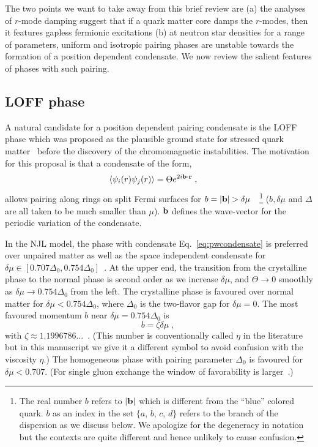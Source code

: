 \documentclass[10pt, aps, prd, superscriptaddress, nofootinbib, 
               amsmath, amssymb, twocolumn,
               preprintnumbers, showpacs,
               raggedbottom,
               floatfix]{revtex4-1}
\newcommand{\bfr}{{\bf{r}}}
\newcommand{\bfb}{{\bf{b}}}
\begin{document}
The two points we want to take away from this brief review are (a) the
analyses of $r$-mode damping suggest that if a quark matter core damps the
$r$-modes,  then it features gapless fermionic excitations (b) at neutron
star densities for a range of parameters, uniform and isotropic pairing phases are
unstable towards the formation of a position dependent condensate. We now 
review the salient features of phases with such pairing.

\subsection{LOFF phase}
\label{loff}
A natural candidate for a position dependent pairing condensate is the LOFF
phase which was proposed as the plausible ground state for stressed quark
matter~\cite{Alford:2000ze,Kundu:2001tt} before the discovery of the
chromomagnetic instabilities. The motivation for this proposal is that a
condensate of the form,
\begin{equation}
\begin{split}
\langle\psi_{i}(r)\psi_{j}(r)\rangle &=  \Theta
e^{2i\bfb\cdot\bfr}\;,~\label{eq:pwcondensate}
\end{split}
\end{equation}
allows pairing along rings on split Fermi surfaces for
$b=|\bfb|>\delta\mu$~\cite{Alford:2000ze}~\footnote{The real number $b$ refers
to $|\bfb|$ which is different from the ``blue'' colored quark. $b$ as an index
in the set $\{a$, $b$, $c$, $d\}$ refers to the branch of the dispersion as we
discuss below. We apologize for the degeneracy in notation but the contexts
are quite different and hence unlikely to cause confusion.} ($b,
\delta\mu$ and $\Delta$ are all taken
to be much smaller than $\mu$). $\bfb$ defines the wave-vector for the periodic
variation of the condensate.

In the NJL model, the phase with condensate Eq.~\ref{eq:pwcondensate} is preferred over
unpaired matter as well as the space independent condensate for
$\delta\mu\in[0.707\Delta_0,0.754\Delta_0]$~\cite{Alford:2000ze}. At the
upper end, the  transition from the crystalline phase to the normal phase is
second order as we increase $\delta\mu$, and $\Theta\rightarrow 0$ smoothly as
$\delta\mu\rightarrow0.754\Delta_0$ from the left. The
crystalline phase is favoured over normal matter for $\delta\mu<0.754\Delta_0$,
where $\Delta_0$ is the two-flavor gap for $\delta\mu=0$. The most favoured
momentum $b$ near $\delta\mu=0.754\Delta_0$ is
\begin{equation}
b=\zeta\delta\mu\;,~\label{eq:eta}
\end{equation}
with $\zeta\approx1.1996786...$~\cite{larkin1964nonuniform,fulde1964superconductivity,
Bowers:2002xr,Bowers:2003ye,Mannarelli:2006}.  (This number is
conventionally called $\eta$ in the literature but in this manuscript we give
it a different symbol to avoid confusion with the viscosity $\eta$.) The
homogeneous phase with pairing parameter $\Delta_0$ is favoured for
$\delta\mu<0.707$. (For single gluon exchange the window of favorability is
larger~\cite{Leibovich:2001xr}.) 
\end{document}
